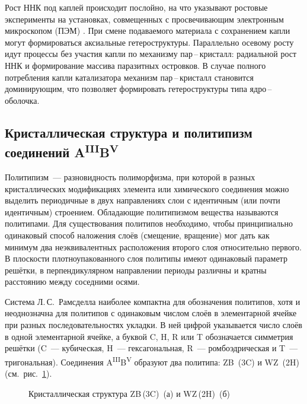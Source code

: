 Рост ННК под каплей происходит послойно, на что указывают ростовые эксперименты
на установках, совмещенных с просвечивающим электронным микроскопом (ПЭМ)
\cite{Hofmann2008, Wen2009, Jacobsson2016}. При смене подаваемого материала с
сохранением капли могут формироваться аксиальные гетероструктуры. Параллельно
осевому росту идут процессы без участия капли по механизму пар\,--\,кристалл:
радиальной рост ННК и формирование массива паразитных островков. В случае
полного потребления капли катализатора механизм пар\,--\,кристалл становится
доминирующим, что позволяет формировать гетероструктуры типа
ядро\,--\,оболочка.

\subsection{Кристаллическая структура и политипизм соединений
A\textsuperscript{III}B\textsuperscript{V}}\label{subsec:ch1/sec2/sub3}

Политипизм~--- разновидность полиморфизма, при которой в разных кристаллических
модификациях элемента или химического соединения можно выделить периодичные в
двух направлениях слои с идентичным (или почти идентичным) строением.
Обладающие политипизмом вещества называются политипами. Для существования
политипов необходимо, чтобы принципиально одинаковый способ наложения слоёв
(смещение, вращение) мог дать как минимум два неэквивалентных расположения
второго слоя относительно первого. В плоскости плотноупакованного слоя политипы
имеют одинаковый параметр решётки, в перпендикулярном направлении периоды
различны и кратны расстоянию между соседними осями.

Система Л.\,С.~Рамсделла наиболее компактна для обозначения политипов, хотя и
неоднозначна для политипов с одинаковым числом слоёв в элементарной ячейке при
разных последовательностях укладки. В ней цифрой указывается число слоёв в
одной элементарной ячейке, а буквой C, H, R или T обозначается симметрия
решётки (C~--- кубическая, H~--- гексагональная, R~--- ромбоэдрическая и T~---
тригональная). Соединения A\textsuperscript{III}B\textsuperscript{V} образуют
два политипа: ZB~(3C) и WZ~(2H) (см.~рис.~\cref{fig:Image_5}).

\begin{figure}[ht] 
		\caption{Кристаллическая структура ZB\,(3C)~(а) и
		WZ\,(2H)~(б)}\label{fig:Image_5} \end{figure}


